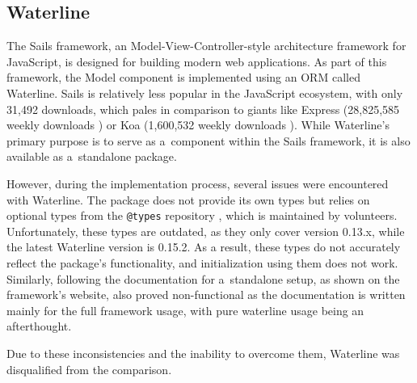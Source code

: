 \subsection{Waterline}\label{ch:waterline}

The Sails framework, an Model-View-Controller-style \cite[p.
330]{fowler-patterns-2003} architecture framework for JavaScript, is designed
for building modern web applications. As part of this framework, the Model
component is implemented using an ORM called Waterline. Sails is relatively less
popular in the JavaScript ecosystem, with only 31,492 downloads, which pales in
comparison to giants like Express (28,825,585 weekly downloads
\cite{express_2022}) or Koa (1,600,532 weekly downloads \cite{koa_2023}). While
Waterline's primary purpose is to serve as a~component within the Sails
framework, it is also available as a~standalone package.

However, during the implementation process, several issues were encountered with
Waterline. The package does not provide its own types but relies on optional
types from the \texttt{@types} repository \cite{definitelytyped/types/waterline}, which
is maintained by volunteers. Unfortunately, these types are outdated, as they
only cover version 0.13.x, while the latest Waterline version is 0.15.2. As a
result, these types do not accurately reflect the package's functionality, and
initialization using them does not work. Similarly, following the documentation
for a~standalone setup, as shown on the framework's website, also proved
non-functional as the documentation \cite{waterline-docs} is written mainly for
the full framework usage, with pure waterline usage being an afterthought.

Due to these inconsistencies and the inability to overcome them, Waterline was
disqualified from the comparison.